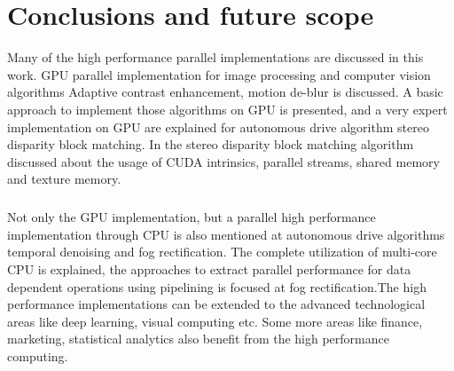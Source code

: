 \chapter{Conclusions and future scope}
Many of the high performance parallel implementations are discussed in this work. GPU parallel implementation for image processing and computer vision algorithms Adaptive contrast enhancement, motion de-blur is discussed. A basic approach to implement those algorithms on GPU is presented, and a very expert implementation on GPU are explained for autonomous drive algorithm stereo disparity block matching. In the stereo disparity block matching algorithm discussed about the usage of CUDA intrinsics, parallel streams, shared memory and texture memory.

\paragraph*{}Not only the GPU implementation, but a parallel high performance implementation through CPU is also mentioned at autonomous drive algorithms temporal denoising and fog rectification. The complete utilization of multi-core CPU is explained, the approaches to extract parallel performance for data dependent operations using pipelining is focused at fog rectification.The high performance implementations can be extended to the advanced technological areas like deep learning, visual computing etc. Some more areas like finance, marketing, statistical analytics also benefit from the high performance computing. 